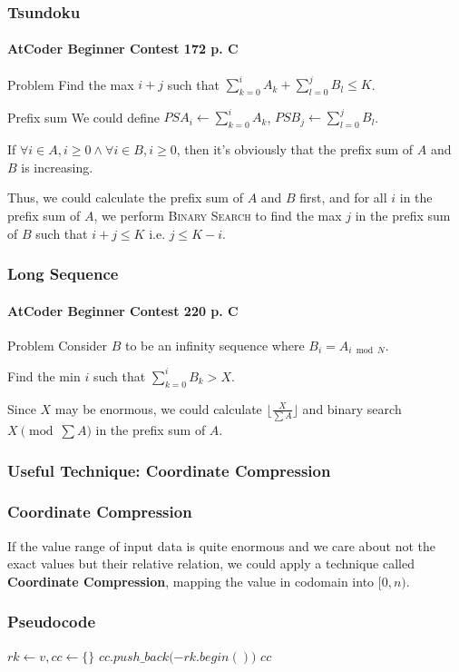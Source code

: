 \documentclass{beamer}
\begin{document}
\frame
{
	\frametitle{Tsundoku}
	\framesubtitle{AtCoder Beginner Contest 172 p. C}
	
	\begin{block}{Problem}
		Find the max $i+j$ such that $\sum_{k=0}^iA_k + \sum_{l=0}^jB_l \leq K$.
	\end{block}
	
	\pause
	
	\begin{block}{Prefix sum}
		We could define $PSA_i\gets\sum_{k=0}^iA_k$, $PSB_j\gets\sum_{l=0}^jB_l$.\pause
		
		If $\forall i\in A, i\geq 0\land\forall i\in B, i\geq 0$, then it's obviously that the prefix sum of $A$ and $B$ is increasing.\pause
	\end{block}
	
	Thus, we could calculate the prefix sum of $A$ and $B$ first, and for all $i$ in the prefix sum of $A$, we perform \textsc{Binary Search} to find the max $j$ in the prefix sum of $B$ such that $i+j\leq K$ i.e. $j\leq K-i$.
}

\frame
{
	\frametitle{Long Sequence}
	\framesubtitle{AtCoder Beginner Contest 220 p. C}
	
	\begin{block}{Problem}
		Consider $B$ to be an infinity sequence where $B_i = A_{i\bmod N}$.
		
		Find the min $i$ such that $\sum_{k=0}^iB_k > X$.
	\end{block}
	
	\pause
	
	Since $X$ may be enormous, we could calculate $\lfloor\frac{X}{\sum A}\rfloor$ and binary search $X\pmod{\sum A}$ in the prefix sum of $A$.
}

\subsubsection{Useful Technique: Coordinate Compression}

\frame
{
	\frametitle{Coordinate Compression}
	
	If the value range of input data is quite enormous and we care about not the exact values but their relative relation, we could apply a technique called \textbf{Coordinate Compression}, mapping the value in codomain into $[0, n)$.
}

\frame
{
	\frametitle{Pseudocode}
	
	\begin{algorithmic}
		\small
    		\State$rk\gets v, cc\gets \{\}$
			\State{}
			\State{}
				\State$cc.push\_back($$ - rk.begin())$
			\EndFor
			\State\Return$cc$
        \EndProcedure
	\end{algorithmic}
}
\end{document}

